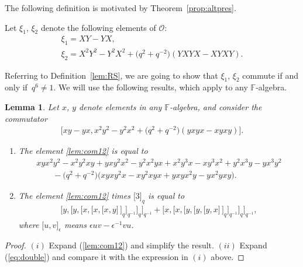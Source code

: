 \documentclass[pdftex]{sigma}
\numberwithin{equation}{section}
\newtheorem{Lemma}[Theorem]{Lemma}
\begin{document}
  The following def\/inition
is motivated by
Theorem~\ref{prop:altpres}.

\begin{Definition}
\label{lem:RS}
Let $\xi_1$, $\xi_2$ denote the following elements of
$\mathcal O$:
\begin{gather*}
\xi_1 =  XY-YX,
\\
 \xi_2 =
X^2Y^2-Y^2X^2+\big(q^2+q^{-2}\big)(YXYX-XYXY).
\end{gather*}
\end{Definition}


Referring to Def\/inition~\ref{lem:RS},
we are going to show that
$\xi_1$, $\xi_2$
commute if and only if~$q^6 \not=1$.
We will use the following results, which
apply to any $\mathbb F$-algebra.

\begin{Lemma}
\label{lem:gen}
Let $x$, $y$ denote elements in any $\mathbb F$-algebra,
and consider the commutator
\begin{gather}
\big\lbrack
xy-yx, x^2y^2-y^2x^2 +\big(q^2+q^{-2}\big)(yxyx-xyxy)
\big\rbrack.
\label{lem:com12}
\end{gather}
\begin{enumerate}\itemsep=0pt
\item[$(i)$] The element
\eqref{lem:com12} is equal to
\begin{gather*}
 xyx^2y^2-x^2y^2xy+yxy^2x^2-y^2x^2yx
+
x^2y^3x-xy^3x^2+y^2x^3y-yx^3y^2
\\
 \qquad {} -
\big(q^2+q^{-2}\big)\big(
xyxy^2x
-xy^2xyx
+yxyx^2y
-yx^2yxy
\big).
\end{gather*}
\item[$(ii)$] The element
\eqref{lem:com12} times
$\lbrack 3\rbrack_q$ is equal to
\begin{gather}
\lbrack y,
\lbrack y,
\lbrack x,
\lbrack x,
\lbrack x,
y
\rbrack \,
\rbrack_q
\rbrack_{q^{-1}}
\rbrack_q
\rbrack_{q^{-1}}
+
\lbrack x,
\lbrack x,
\lbrack y,
\lbrack y,
\lbrack y,
x
\rbrack \,
\rbrack_q
\rbrack_{q^{-1}}
\rbrack_q
\rbrack_{q^{-1}},
\label{eq:double}
\end{gather}
where $\lbrack u,v\rbrack_\epsilon $ means $\epsilon uv-
\epsilon^{-1}vu$.
\end{enumerate}
\end{Lemma}

\begin{proof}
$(i)$ Expand
(\ref{lem:com12}) and simplify the result.
$(ii)$
Expand
(\ref{eq:double})
and compare it with the expression in $(i)$ above.
\end{proof}
\end{document}
